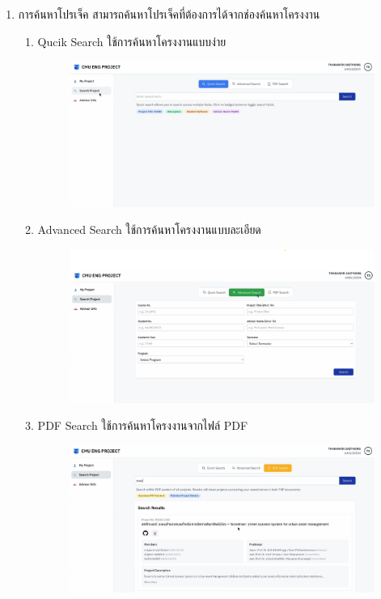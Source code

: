 \begin{itemize}
\begin{enumerate}
\begin{figure}[H]
{        }
    \end{figure}
    \newpage
    \item การค้นหาโปรเจ็ค สามารถค้นหาโปรเจ็คที่ต้องการได้จากช่องค้นหาโครงงาน 
    \begin{enumerate}
        \item Qucik Search ใช้การค้นหาโครงงานแบบง่าย
        \begin{figure}[H]
            \centering
            \includegraphics[width=130mm, keepaspectratio ]{pictures/project_box/quick_search.png}
        \end{figure}
        \item Advanced Search ใช้การค้นหาโครงงานแบบละเอียด
        \begin{figure}[H]
            \centering
            \includegraphics[width=130mm, keepaspectratio ]{pictures/project_box/advance_search.png}
        \end{figure} 
        \item PDF Search ใช้การค้นหาโครงงานจากไฟล์ PDF
        \begin{figure}[H]
            \centering
            \includegraphics[width=130mm, keepaspectratio ]{pictures/project_box/pdf_search.png}

\end{figure}
\end{enumerate}
\end{enumerate}
\end{itemize}

